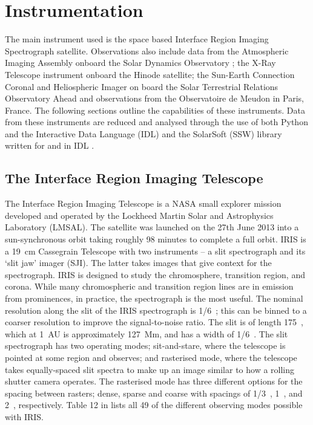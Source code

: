 \section{Instrumentation}
The main instrument used is the space based Interface Region Imaging Spectrograph \citep[IRIS; ][]{depontieu_interface_2014} satellite. Observations also include data from the Atmospheric Imaging Assembly \citep[AIA; ][]{lemen_atmospheric_2012} onboard the Solar Dynamics Observatory \citep[SDO; ][]{pesnell_solar_2012}; the X-Ray Telescope \citep[XRT; ][]{golub_x-ray_2007} instrument onboard the Hinode \citep{kosugi_hinode_2007} satellite; the Sun-Earth Connection Coronal and Heliospheric Imager \citep[SECCHI; ][]{howard_sun_2008} on board the Solar Terrestrial Relations Observatory Ahead \citep[STEREO-A; ][]{driesman_stereo_2008} and \ha{} observations from the Observatoire de Meudon in Paris, France. The following sections outline the capabilities of these instruments. Data from these instruments are reduced and analysed through the use of both Python and the Interactive Data Language (IDL) and the SolarSoft (SSW) library written for and in IDL \citep{freeland_data_1998}.


\subsection{The Interface Region Imaging Telescope}
The Interface Region Imaging Telescope \citep[IRIS; ][]{depontieu_interface_2014} is a NASA small explorer mission developed and operated by the Lockheed Martin Solar and Astrophysics Laboratory (LMSAL). The satellite was launched on the 27th June 2013 into a sun-synchronous orbit taking roughly 98 minutes to complete a full orbit. IRIS is a 19~cm Cassegrain Telescope with two instruments -- a slit spectrograph and its `slit jaw' imager (SJI). The latter takes images that give context for the spectrograph. IRIS is designed to study the chromosphere, transition region, and corona. While many chromospheric and transition region lines are in emission from prominences, in practice, the \mgiihk{} spectrograph is the most useful. The nominal resolution along the slit of the IRIS spectrograph is 1/6~\arcsec; this can be binned to a coarser resolution to improve the signal-to-noise ratio. The slit is of length 175~\arcsec, which at 1~AU is approximately 127~Mm, and has a width of 1/6~\arcsec. The slit spectrograph has two operating modes; sit-and-stare, where the telescope is pointed at some region and observes; and rasterised mode, where the telescope takes equally-spaced slit spectra to make up an image similar to how a rolling shutter camera operates. The rasterised mode has three different options for the spacing between rasters; dense, sparse and coarse with spacings of 1/3~\arcsec, 1~\arcsec, and 2~\arcsec, respectively. Table 12 in \cite{depontieu_interface_2014} lists all 49 of the different observing modes possible with IRIS.

